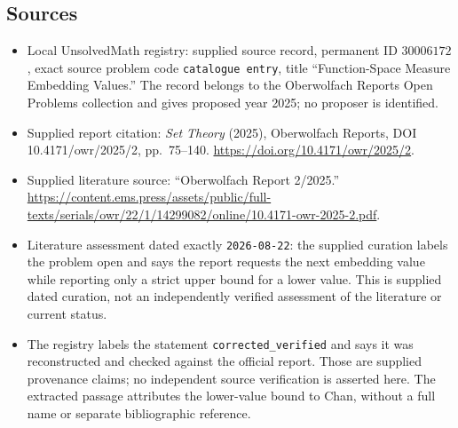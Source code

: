 \documentclass[11pt]{article}
\begin{document}
\subsection{Sources}
\begin{itemize}
\item Local UnsolvedMath registry: supplied source record, permanent ID \(30006172\), exact source problem code \texttt{catalogue entry}, title ``Function-Space Measure Embedding Values.'' The record belongs to the Oberwolfach Reports Open Problems collection and gives proposed year 2025; no proposer is identified.
\item Supplied report citation: \emph{Set Theory} (2025), Oberwolfach Reports, DOI 10.4171/owr/2025/2, pp.\ 75--140. \url{https://doi.org/10.4171/owr/2025/2}.
\item Supplied literature source: ``Oberwolfach Report 2/2025.'' \url{https://content.ems.press/assets/public/full-texts/serials/owr/22/1/14299082/online/10.4171-owr-2025-2.pdf}.
\item Literature assessment dated exactly \texttt{2026-08-22}: the supplied curation labels the problem open and says the report requests the next embedding value while reporting only a strict upper bound for a lower value. This is supplied dated curation, not an independently verified assessment of the literature or current status.
\item The registry labels the statement \texttt{corrected\_verified} and says it was reconstructed and checked against the official report. Those are supplied provenance claims; no independent source verification is asserted here. The extracted passage attributes the lower-value bound to Chan, without a full name or separate bibliographic reference.
\end{itemize}
\end{document}
